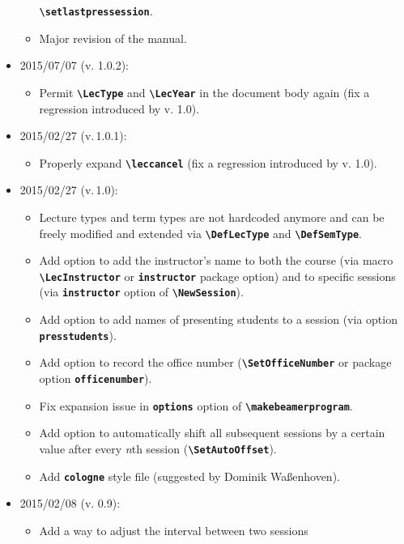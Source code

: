 \documentclass[english]{article}
\newcommand*\jmacro[1]{\textbf{\texttt{#1}}}
\newcommand*\jcsmacro[1]{\jmacro{\textbackslash{#1}}}
\newcommand*\joption[1]{\textbf{\texttt{#1}}}
\begin{document}
\begin{itemize}
\begin{itemize}
             \jcsmacro{setlastpressession}.
       \item Major revision of the manual.
     \end{itemize}
\item 2015/07/07 (v. 1.0.2):
     \begin{itemize}
       \item Permit \jcsmacro{LecType} and \jcsmacro{LecYear} in the document body again
             (fix a regression introduced by v. 1.0).
     \end{itemize}
\item 2015/02/27 (v.\,1.0.1):
     \begin{itemize}
       \item Properly expand \jcsmacro{leccancel}
             (fix a regression introduced by v. 1.0).
     \end{itemize}
\item 2015/02/27 (v.\,1.0):
     \begin{itemize}
       \item Lecture types and term types are not hardcoded anymore and can be freely
             modified and extended via \jcsmacro{DefLecType} and \jcsmacro{DefSemType}.
       \item Add option to add the instructor's name to both the course (via macro
             \jcsmacro{LecInstructor} or \joption{instructor} package option) and
             to specific sessions (via \joption{instructor} option of
             \jcsmacro{NewSession}).
       \item Add option to add names of presenting students to a session (via option
             \joption{presstudents}).
       \item Add option to record the office number (\jcsmacro{SetOfficeNumber}
             or package option \joption{officenumber}).
       \item Fix expansion issue in \joption{options} option of \jcsmacro{makebeamerprogram}.
       \item Add option to automatically shift all subsequent sessions by a certain value
             after every \emph{n}th session (\jcsmacro{SetAutoOffset}).
       \item Add \joption{cologne} style file (suggested by Dominik Waßenhoven).
    \end{itemize}
\item 2015/02/08 (v. 0.9):
     \begin{itemize}
       \item Add a way to adjust the interval between two sessions

\end{itemize}
\end{itemize}
\end{document}
